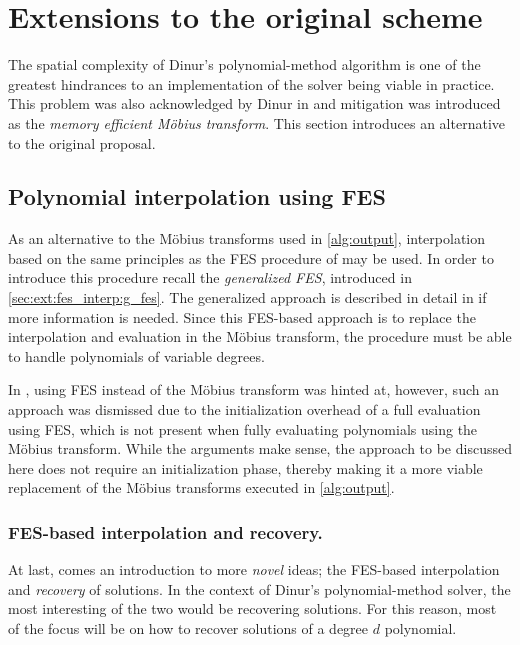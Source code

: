 \section{Extensions to the original scheme} \label{sec:ext}
The spatial complexity of Dinur's polynomial-method algorithm is one of the greatest hindrances to an implementation of the solver being viable in practice. This problem was also acknowledged by Dinur in \cite{eurocrypt-2021-30841} and mitigation was introduced as the \textit{memory efficient Möbius transform}. This section introduces an alternative to the original proposal.
 
\subsection{Polynomial interpolation using FES} \label{sec:ext:fes_interp}
As an alternative to the Möbius transforms used in \cref{alg:output}, interpolation based on the same principles as the FES procedure of \cite{ches-2010-23990} may be used. In order to introduce this procedure recall the \textit{generalized FES}, introduced in \cref{sec:ext:fes_interp:g_fes}. The generalized approach is described in detail in \cite{tungchoumasters} if more information is needed. Since this FES-based approach is to replace the interpolation and evaluation in the Möbius transform, the procedure must be able to handle polynomials of variable degrees.

In \cite{eurocrypt-2021-30841}, using FES instead of the Möbius transform was hinted at, however, such an approach was dismissed due to the initialization overhead of a full evaluation using FES, which is not present when fully evaluating polynomials using the Möbius transform. While the arguments make sense, the approach to be discussed here does not require an initialization phase, thereby making it a more viable replacement of the Möbius transforms executed in \cref{alg:output}.

\subsubsection{FES-based interpolation and recovery.} \label{sec:ext:fes_interp:interp_recover}

At last, comes an introduction to more \textit{novel} ideas; the FES-based interpolation and \textit{recovery} of solutions. In the context of Dinur's polynomial-method solver, the most interesting of the two would be recovering solutions. For this reason, most of the focus will be on how to recover solutions of a degree $d$ polynomial.

